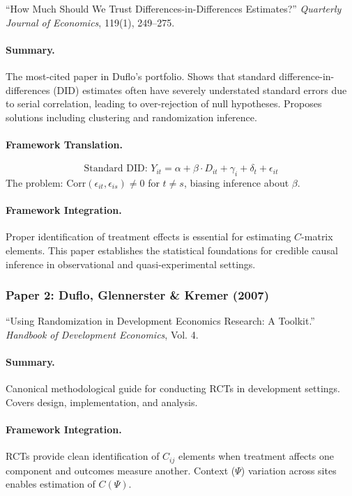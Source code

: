 ``How Much Should We Trust Differences-in-Differences Estimates?''
\textit{Quarterly Journal of Economics}, 119(1), 249--275.

\paragraph{Summary.}
The most-cited paper in Duflo's portfolio. Shows that standard difference-in-differences
(DID) estimates often have severely understated standard errors due to serial correlation,
leading to over-rejection of null hypotheses. Proposes solutions including clustering and
randomization inference.

\paragraph{Framework Translation.}
\begin{equation}
  \text{Standard DID: } Y_{it} = \alpha + \beta \cdot D_{it} + \gamma_i + \delta_t + \epsilon_{it}
\end{equation}
The problem: $\text{Corr}(\epsilon_{it}, \epsilon_{is}) \neq 0$ for $t \neq s$, biasing inference about $\beta$.

\paragraph{Framework Integration.}
Proper identification of treatment effects is essential for estimating $C$-matrix elements.
This paper establishes the statistical foundations for credible causal inference in
observational and quasi-experimental settings.

\subsubsection{Paper 2: Duflo, Glennerster \& Kremer (2007)}

``Using Randomization in Development Economics Research: A Toolkit.''
\textit{Handbook of Development Economics}, Vol. 4.

\paragraph{Summary.}
Canonical methodological guide for conducting RCTs in development settings.
Covers design, implementation, and analysis.

\paragraph{Framework Integration.}
RCTs provide clean identification of $C_{ij}$ elements when treatment affects
one component and outcomes measure another. Context ($\Psi$) variation across
sites enables estimation of $C(\Psi)$.

